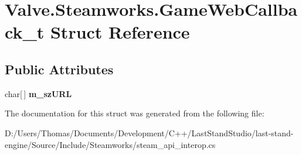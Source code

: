 \hypertarget{structValve_1_1Steamworks_1_1GameWebCallback__t}{}\section{Valve.\+Steamworks.\+Game\+Web\+Callback\+\_\+t Struct Reference}
\label{structValve_1_1Steamworks_1_1GameWebCallback__t}
\subsection*{Public Attributes}
\begin{DoxyCompactItemize}
\item 
\hypertarget{structValve_1_1Steamworks_1_1GameWebCallback__t_a93f3f37b2992cd06f1ea35230aff7215}{}char\mbox{[}$\,$\mbox{]} {\bfseries m\+\_\+sz\+U\+R\+L}\label{structValve_1_1Steamworks_1_1GameWebCallback__t_a93f3f37b2992cd06f1ea35230aff7215}

\end{DoxyCompactItemize}


The documentation for this struct was generated from the following file\+:\begin{DoxyCompactItemize}
\item 
D\+:/\+Users/\+Thomas/\+Documents/\+Development/\+C++/\+Last\+Stand\+Studio/last-\/stand-\/engine/\+Source/\+Include/\+Steamworks/steam\+\_\+api\+\_\+interop.\+cs\end{DoxyCompactItemize}

